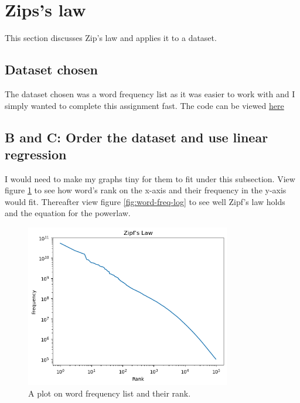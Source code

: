 \documentclass[a4paper,11pt]{article}
\begin{document}
\section{Zips's law}

This section discusses Zip's law and applies it to a dataset. 
\subsection{Dataset chosen}
The dataset chosen was a word frequency list as it was easier to work with and I simply wanted to complete this assignment fast. The code can be viewed \href{https://github.com/RakinAli/Homework-3---DA2210/tree/main}{here}
\newpage

\subsection{B and C: Order the dataset and use linear regression}
I would need to make my graphs tiny for them to fit under this subsection. View figure \ref{fig:word-freq} to see how word's rank on the x-axis and their frequency in the y-axis would fit. Thereafter view figure \ref{fig:word-freq-log} to see well Zipf's law holds and the equation for the powerlaw. 

\begin{figure}
    \centering
    \includegraphics[width=0.8\textwidth]{wordfreq.png}
    \caption{A plot on word frequency list and their rank.}
    \label{fig:word-freq}
\end{figure}
\end{document}
